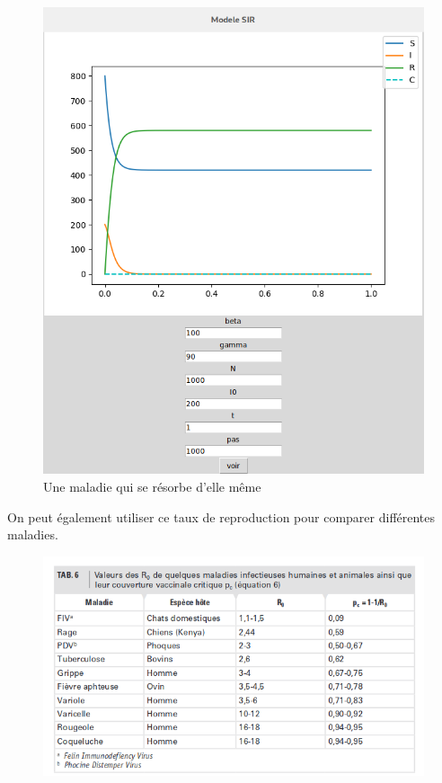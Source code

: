 \documentclass[a4paper]{article}
\theoremstyle{plain}
\theoremstyle{definition}
\theoremstyle{remark}
\begin{document}
\begin{figure}[h]
    \centering
    \includegraphics{fin_petite_ep.png}
    \caption{Une maladie qui se résorbe d'elle même}
\end{figure}{}


On peut également utiliser ce taux de reproduction pour comparer différentes maladies.

\begin{figure}[!h]
\begin{center}
   \includegraphics[scale= 0.6]{tab.png}
   \end{center}
\end{figure}
\end{document}

